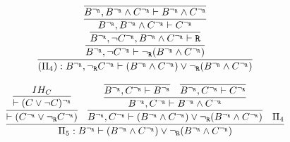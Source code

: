\begin{enumerate}[(i)]
\begin{itemize}
            $$
                \infer{
                    (\Pi_4) : B^{\neg_\R}, \neg_\R C^{\neg_\R} \vdash (B^{\neg_\R} \wedge C^{\neg_\R}) \vee \neg_\R(B^{\neg_\R} \wedge C^{\neg_\R})
                }{
                    \infer{
                        B^{\neg_\R}, \neg C^{\neg_\R} \vdash \neg_\R(B^{\neg_\R} \wedge C^{\neg_\R})
                    }{
                        \infer{
                            B^{\neg_\R}, \neg C^{\neg_\R}, B^{\neg_\R} \wedge C^{\neg_\R} \vdash \R
                        }{
                            \infer{
                                B^{\neg_\R}, B^{\neg_\R} \wedge C^{\neg_\R} \vdash C^{\neg_\R}
                            }{
                                \infer{
                                    B^{\neg_\R}, B^{\neg_\R} \wedge C^{\neg_\R} \vdash B^{\neg_\R} \wedge C^{\neg_\R}
                                }{
                                }
                            }
                        }
                    }
                }
            $$


            $$
            \infer{
                \Pi_5 : B^{\neg_\R} \vdash (B^{\neg_\R} \wedge C^{\neg_\R}) \vee \neg_\R(B^{\neg_\R} \wedge C^{\neg_\R})
            }{
                \infer{
                    \vdash (C^{\neg_\R} \vee \neg_\R C^{\neg_\R})
                }{
                    \infer{
                        \vdash (C \vee \neg C)^{\neg_\R}
                    }{
                        IH_C
                    }
                }&
                \infer{
                    B^{\neg_\R}, C^{\neg_\R} \vdash (B^{\neg_\R} \wedge C^{\neg_\R}) \vee \neg_\R(B^{\neg_\R} \wedge C^{\neg_\R})
                }{
                    \infer{
                        B^{\neg_\R}, C^{\neg_\R} \vdash B^{\neg_\R} \wedge C^{\neg_\R}
                    }{
                        \infer{
                            B^{\neg_\R}, C^{\neg_\R} \vdash B^{\neg_\R}
                        }{
                        }&
                        \infer{
                            B^{\neg_\R}, C^{\neg_\R} \vdash C^{\neg_\R}
                        }{
                        }
                    }
                }&
                \Pi_4
            }
            $$


\end{itemize}
\end{enumerate}
